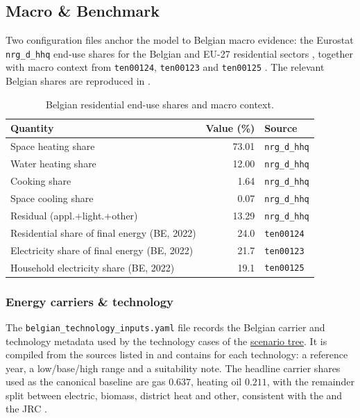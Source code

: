 \subsection{Macro \& Benchmark}
\label{sec:macro_benchmark}

Two configuration files anchor the model to Belgian macro evidence: the Eurostat \texttt{nrg\_d\_hhq} end-use shares for the Belgian and EU-27 residential sectors \cite{eurostat_disaggregated_nodate}, together with macro context from \texttt{ten00124}, \texttt{ten00123} and \texttt{ten00125} \cite{EurostatTen00124,EurostatTen00125}. The relevant Belgian shares are reproduced in .

\begin{table}[ht]
  \centering
  \footnotesize
  \caption{Belgian residential end-use shares and macro context.}
  \label{tab:macro_benchmark}
  \begin{tabular}{@{}l r l@{}}
    \toprule
    \textbf{Quantity} & \textbf{Value (\%)} & \textbf{Source} \\
    \midrule
    Space heating share        & 73.01 & \texttt{nrg\_d\_hhq} \\
    Water heating share        & 12.00 & \texttt{nrg\_d\_hhq} \\
    Cooking share              &  1.64 & \texttt{nrg\_d\_hhq} \\
    Space cooling share        &  0.07 & \texttt{nrg\_d\_hhq} \\
    Residual (appl.+light.+other) & 13.29 & \texttt{nrg\_d\_hhq} \\
    \midrule
    Residential share of final energy (BE, 2022)  & 24.0 & \texttt{ten00124} \\
    Electricity share of final energy (BE, 2022)  & 21.7 & \texttt{ten00123} \\
    Household electricity share (BE, 2022)        & 19.1 & \texttt{ten00125} \\
    \bottomrule
  \end{tabular}
\end{table}

\subsubsection*{Energy carriers \& technology}
The \texttt{belgian\_technology\_inputs.yaml} file records the Belgian carrier and technology metadata used by the technology cases of the \hyperref[sec:scenarioTreeSystem]{scenario tree}. It is compiled from the sources listed in  and contains for each technology: a reference year, a low/base/high range and a suitability note. The headline carrier shares used as the canonical baseline are gas $0.637$, heating oil $0.211$, with the remainder split between electric, biomass, district heat and other, consistent with the \textcite{KBSFrb2024} and the JRC \cite{JRC2022HeatPumpBelgium}.

